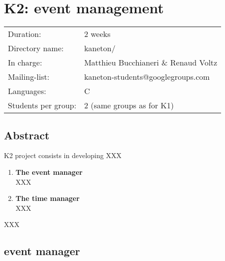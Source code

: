 
%
%

\chapter{K2: event management}

%
%

\begin{tabular}{p{7cm}l}
Duration: & 2 weeks \\
Directory name: & kaneton/ \\
In charge: & Matthieu Bucchianeri \& Renaud Voltz\\
Mailing-list: & kaneton-students@googlegroups.com \\
Languages: & C \\
Students per group: & 2 (same groups as for K1) \\
\end{tabular}

\section{Abstract}

K2 project consists in developing XXX

\begin{enumerate}
  \item
    {\bf The event manager}\\
    XXX
  \item
    {\bf The time manager}\\
    XXX
\end{enumerate}

XXX

%
%

\newpage

\section{\textbf{event} manager}

